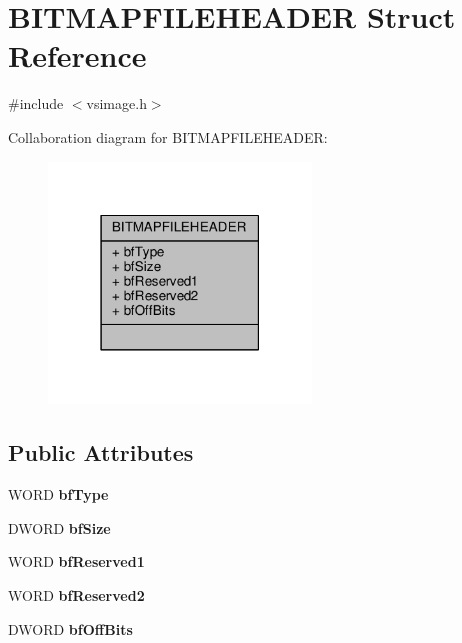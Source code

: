 \hypertarget{structBITMAPFILEHEADER}{}\section{B\+I\+T\+M\+A\+P\+F\+I\+L\+E\+H\+E\+A\+D\+ER Struct Reference}
\label{structBITMAPFILEHEADER}


{\ttfamily \#include $<$vsimage.\+h$>$}



Collaboration diagram for B\+I\+T\+M\+A\+P\+F\+I\+L\+E\+H\+E\+A\+D\+ER\+:
\nopagebreak
\begin{figure}[H]
\begin{center}
\leavevmode
\includegraphics[width=198pt]{dd/d24/structBITMAPFILEHEADER__coll__graph}
\end{center}
\end{figure}
\subsection*{Public Attributes}
\begin{DoxyCompactItemize}
\item 
W\+O\+RD {\bfseries bf\+Type}\hypertarget{structBITMAPFILEHEADER_a7781f8145f964b71d7361ee2f958b456}{}\label{structBITMAPFILEHEADER_a7781f8145f964b71d7361ee2f958b456}

\item 
D\+W\+O\+RD {\bfseries bf\+Size}\hypertarget{structBITMAPFILEHEADER_a0fe0b806d46d1ad4a8a496208cc995a8}{}\label{structBITMAPFILEHEADER_a0fe0b806d46d1ad4a8a496208cc995a8}

\item 
W\+O\+RD {\bfseries bf\+Reserved1}\hypertarget{structBITMAPFILEHEADER_af72353342176ea4041b9e33f6bbf4b29}{}\label{structBITMAPFILEHEADER_af72353342176ea4041b9e33f6bbf4b29}

\item 
W\+O\+RD {\bfseries bf\+Reserved2}\hypertarget{structBITMAPFILEHEADER_af7e9a15e42d1b91b03c460a6c48aa6be}{}\label{structBITMAPFILEHEADER_af7e9a15e42d1b91b03c460a6c48aa6be}

\item 
D\+W\+O\+RD {\bfseries bf\+Off\+Bits}\hypertarget{structBITMAPFILEHEADER_a6e4e0440b732667cfad36120db68bf10}{}\label{structBITMAPFILEHEADER_a6e4e0440b732667cfad36120db68bf10}

\end{DoxyCompactItemize}


